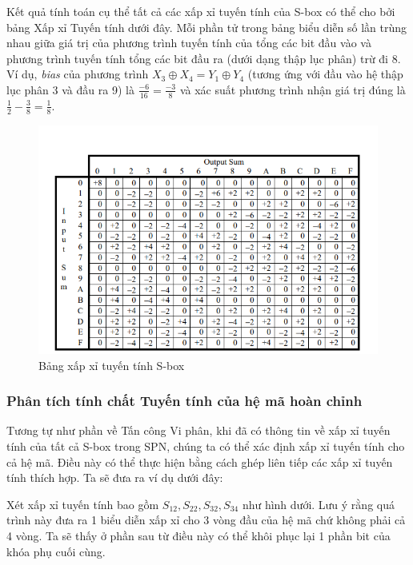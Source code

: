     Kết quả tính toán cụ thể tất cả các xấp xỉ tuyến tính của S-box có thể cho bởi bảng Xấp xỉ Tuyến tính dưới đây. Mỗi phần tử trong bảng biểu diễn số lần trùng nhau giữa giá trị của phương trình tuyến tính của tổng các bit đầu vào và phương trình tuyến tính tổng các bit đầu ra (dưới dạng thập lục phân) trừ đi 8. Ví dụ, \emph{bias} của phương trình $X_3 \oplus X_4 = Y_1 \oplus Y_4$ (tương ứng với đầu vào hệ thập lục phân 3 và đầu ra 9) là $\frac{-6}{16} = \frac{-3}{8}$ và xác suất phương trình nhận giá trị đúng là $\frac{1}{2} - \frac{3}{8} = \frac{1}{8}$.
    \begin{figure}
    \centering
    \includegraphics[scale = 0.9]{Các công cụ và kĩ thuật sử dụng trong tấn công/linear approx table.png}
    \caption{Bảng xấp xỉ tuyến tính S-box}
    
    \end{figure}
\subsubsection{Phân tích tính chất Tuyến tính của hệ mã hoàn chỉnh}
Tương tự như phần về Tấn công Vi phân, khi đã có thông tin về xấp xỉ tuyến tính của tất cả S-box trong SPN, chúng ta có thể xác định xấp xỉ tuyến tính cho cả hệ mã. Điều này có thể thực hiện bằng cách ghép liên tiếp các xấp xỉ tuyến tính thích hợp. Ta sẽ đưa ra ví dụ dưới đây:

Xét xấp xỉ tuyến tính bao gồm $S_{12}, S_{22}, S_{32}, S_{34}$ như hình dưới. Lưu ý rằng quá trình này đưa ra 1 biểu diễn xấp xỉ cho 3 vòng đầu của hệ mã chứ không phải cả 4 vòng. Ta sẽ thấy ở phần sau từ điều này có thể khôi phục lại 1 phần bit của khóa phụ cuối cùng.

